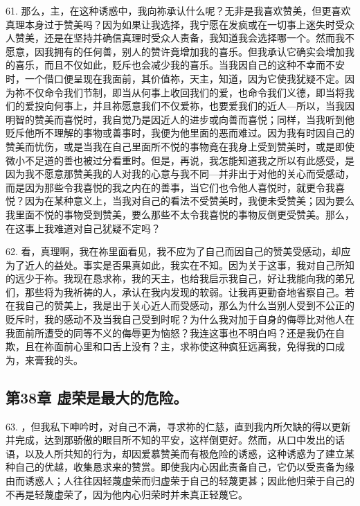 61. 那么，主，在这种诱惑中，我向祢承认什么呢？无非是我喜欢赞美，但更喜欢真理本身过于赞美吗？因为如果让我选择，我宁愿在发疯或在一切事上迷失时受众人赞美，还是在坚持并确信真理时受众人责备，我知道我会选择哪一个。然而我不愿意，因我拥有的任何善，别人的赞许竟增加我的喜乐。但我承认它确实会增加我的喜乐，而且不仅如此，贬斥也会减少我的喜乐。当我因自己的这种不幸而不安时，一个借口便呈现在我面前，其价值祢，天主，知道，因为它使我犹疑不定。因为祢不仅命令我们节制，即当从何事上收回我们的爱，也命令我们义德，即当将我们的爱投向何事上，并且祢愿意我们不仅爱祢，也要爱我们的近人---所以，当我因明智的赞美而喜悦时，我自觉乃是因近人的进步或向善而喜悦；同样，当我听到他贬斥他所不理解的事物或善事时，我便为他里面的恶而难过。因为我有时因自己的赞美而忧伤，或是当我在自己里面所不悦的事物竟在我身上受到赞美时，或是即使微小不足道的善也被过分看重时。但是，再说，我怎能知道我之所以有此感受，是因为我不愿意那赞美我的人对我的心意与我不同---并非出于对他的关心而受感动，而是因为那些令我喜悦的我之内在的善事，当它们也令他人喜悦时，就更令我喜悦？因为在某种意义上，当我对自己的看法不受赞美时，我便未受赞美；因为要么我里面不悦的事物受到赞美，要么那些不太令我喜悦的事物反倒更受赞美。那么，在这事上我难道对自己犹疑不定吗？\par

62. 看，真理啊，我在祢里面看见，我不应为了自己而因自己的赞美受感动，却应为了近人的益处。事实是否果真如此，我实在不知。因为关于这事，我对自己所知的远少于祢。我现在恳求祢，我的天主，也给我启示我自己，好让我能向我的弟兄们，那些将为我祈祷的人，承认在我内发现的软弱。让我再更勤奋地省察自己。若在我自己的赞美上，我是出于关心近人而受感动，那么为什么当别人受到不公正的贬斥时，我的感动不及当我自己受到时呢？为什么我对加于自身的侮辱比对他人在我面前所遭受的同等不义的侮辱更为恼怒？我连这事也不明白吗？还是我仍在自欺，且在祢面前心里和口舌上没有？主，求祢使这种疯狂远离我，免得我的口成为，来膏我的头。\par


\subsection{第38章 虚荣是最大的危险。}

63. ，但我私下呻吟时，对自己不满，寻求祢的仁慈，直到我内所欠缺的得以更新并完成，达到那骄傲的眼目所不知的平安，这样倒更好。然而，从口中发出的话语，以及人所共知的行为，却因爱慕赞美而有极危险的诱惑，这种诱惑为了建立某种自己的优越，收集恳求来的赞赏。即使我内心因此责备自己，它仍以受责备为缘由而诱惑人；人往往因轻蔑虚荣而归虚荣于自己的轻蔑更甚；因此他归荣于自己的不再是轻蔑虚荣了，因为他内心归荣时并未真正轻蔑它。\par

